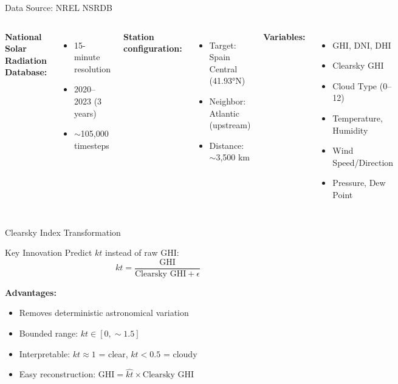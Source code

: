 \documentclass[aspectratio=169,11pt]{beamer}
\begin{document}
\begin{frame}{Data Source: NREL NSRDB}
\begin{columns}
\textbf{National Solar Radiation Database:}
\begin{itemize}
    \item 15-minute resolution
    \item 2020--2023 (3 years)
    \item $\sim$105,000 timesteps
\end{itemize}

\vspace{0.3cm}
\textbf{Station configuration:}
\begin{itemize}
    \item Target: Spain Central (41.93°N)
    \item Neighbor: Atlantic (upstream)
    \item Distance: $\sim$3,500 km
\end{itemize}

\textbf{Variables:}
\begin{itemize}
    \item GHI, DNI, DHI
    \item Clearsky GHI
    \item Cloud Type (0--12)
    \item Temperature, Humidity
    \item Wind Speed/Direction
    \item Pressure, Dew Point
\end{itemize}
\end{columns}
\end{frame}

\begin{frame}{Clearsky Index Transformation}
\begin{block}{Key Innovation}
Predict $kt$ instead of raw GHI:
\[
kt = \frac{\text{GHI}}{\text{Clearsky GHI} + \epsilon}
\]
\end{block}

\vspace{0.3cm}
\textbf{Advantages:}
\begin{itemize}
    \item Removes deterministic astronomical variation
    \item Bounded range: $kt \in [0, \sim1.5]$
    \item Interpretable: $kt \approx 1$ = clear, $kt < 0.5$ = cloudy
    \item Easy reconstruction: $\hat{\text{GHI}} = \hat{kt} \times \text{Clearsky GHI}$
\end{itemize}
\end{frame}
\end{document}
